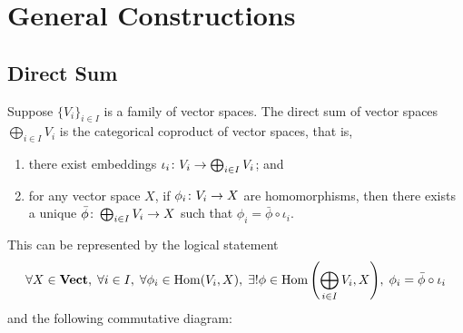 \section{General Constructions}

\subsection*{Direct Sum}

\begin{definition}
    Suppose \({\{V_i\}}_{i \in I}\) is a family of vector spaces.
    The direct sum of vector spaces \(\bigoplus_{i \in I} V_i\)
    is the categorical coproduct of vector spaces, that is,
    \begin{enumerate}[label={(\roman*)}, itemsep=0mm]
        \item there exist embeddings \(\iota_i\colon V_i\to\bigoplus_{i \in I} V_i\); and
        \item for any vector space \(X\),
            if \(\phi_i\colon V_i\to X\) are homomorphisms,
            then there exists a unique \(\bar{\phi}\colon\bigoplus_{i \in I} V_i\to X\)
            such that \(\phi_i = \bar{\phi}\circ\iota_i\).
    \end{enumerate}

    This can be represented by the logical statement
    \begin{equation*}
        \forall X\in\mathbf{Vect},\;
        \forall i \in I,\; \forall \phi_i\in\operatorname{Hom}(V_i,X),\;
        \exists! \phi\in\operatorname{Hom}\qty(\bigoplus_{i \in I} V_i,X),\;
        \phi_i = \bar{\phi}\circ\iota_i
    \end{equation*}
    and the following commutative diagram:
    \begin{center}
    \end{center}
\end{definition}


